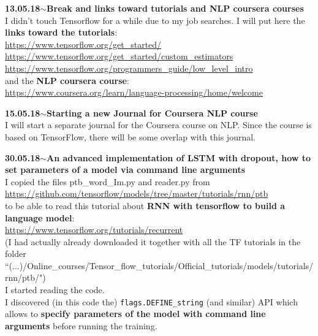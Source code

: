 \documentclass[11pt,a4paper]{article}
\newenvironment{loggentry}[2]%
{\noindent\textbf{#1}\hspace{1cm}$\mathbf{\sim}$\text{ }\textbf{#2}\\}{\vspace{0.5cm}}
\begin{document}
\begin{loggentry}{13.05.18}{Break and links toward tutorials and NLP coursera courses}
I didn't touch Tensorflow for a while due to my job searches. I will put here the \textbf{links toward the tutorials}:\\
\url{https://www.tensorflow.org/get_started/}\\
\url{https://www.tensorflow.org/get_started/custom_estimators}\\
\url{https://www.tensorflow.org/programmers_guide/low_level_intro}\\
and the \textbf{NLP coursera course}:\\
\url{https://www.coursera.org/learn/language-processing/home/welcome}\\
\end{loggentry}

\begin{loggentry}{15.05.18}{Starting a new Journal for Coursera NLP course}
I will start a separate journal for the Coursera course on NLP. Since the course is based on TensorFlow, there will be some overlap with this journal.
\end{loggentry}

\begin{loggentry}{30.05.18}{An advanced implementation of LSTM with dropout, how to set parameters of a model via command line arguments}
I copied the files ptb\_word\_Im.py and reader.py from\\
\url{https://github.com/tensorflow/models/tree/master/tutorials/rnn/ptb}\\
to be able to read this tutorial about \textbf{RNN with tensorflow to build a language model}:\\
\url{https://www.tensorflow.org/tutorials/recurrent}\\
(I had actually already downloaded it together with all the TF tutorials in the folder ``(...)/Online\_courses/Tensor\_flow\_tutorials/Official\_tutorials/models/tutorials/rnn/ptb/")\\
I started reading the code.\\
I discovered (in this code the) \texttt{flags.DEFINE\_string} (and similar) API which allows to \textbf{specify parameters of the model with command line arguments} before running the training.\\
\end{loggentry}
\end{document}
